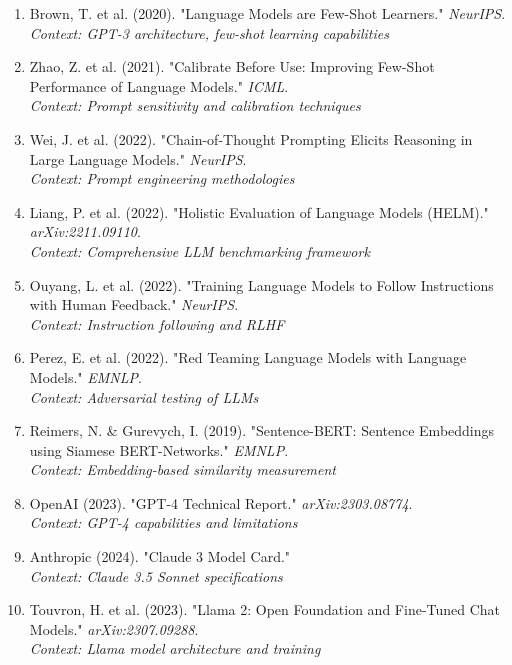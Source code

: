 \documentclass[11pt,a4paper]{article}
\begin{document}
\begin{enumerate}[leftmargin=*]
    \item Brown, T. et al. (2020). "Language Models are Few-Shot Learners." \textit{NeurIPS}. \\
    \textit{Context: GPT-3 architecture, few-shot learning capabilities}
    
    \item Zhao, Z. et al. (2021). "Calibrate Before Use: Improving Few-Shot Performance of Language Models." \textit{ICML}. \\
    \textit{Context: Prompt sensitivity and calibration techniques}
    
    \item Wei, J. et al. (2022). "Chain-of-Thought Prompting Elicits Reasoning in Large Language Models." \textit{NeurIPS}. \\
    \textit{Context: Prompt engineering methodologies}
    
    \item Liang, P. et al. (2022). "Holistic Evaluation of Language Models (HELM)." \textit{arXiv:2211.09110}. \\
    \textit{Context: Comprehensive LLM benchmarking framework}
    
    \item Ouyang, L. et al. (2022). "Training Language Models to Follow Instructions with Human Feedback." \textit{NeurIPS}. \\
    \textit{Context: Instruction following and RLHF}
    
    \item Perez, E. et al. (2022). "Red Teaming Language Models with Language Models." \textit{EMNLP}. \\
    \textit{Context: Adversarial testing of LLMs}
    
    \item Reimers, N. \& Gurevych, I. (2019). "Sentence-BERT: Sentence Embeddings using Siamese BERT-Networks." \textit{EMNLP}. \\
    \textit{Context: Embedding-based similarity measurement}
    
    \item OpenAI (2023). "GPT-4 Technical Report." \textit{arXiv:2303.08774}. \\
    \textit{Context: GPT-4 capabilities and limitations}
    
    \item Anthropic (2024). "Claude 3 Model Card." \\
    \textit{Context: Claude 3.5 Sonnet specifications}
    
    \item Touvron, H. et al. (2023). "Llama 2: Open Foundation and Fine-Tuned Chat Models." \textit{arXiv:2307.09288}. \\
    \textit{Context: Llama model architecture and training}
\end{enumerate}
\end{document}
